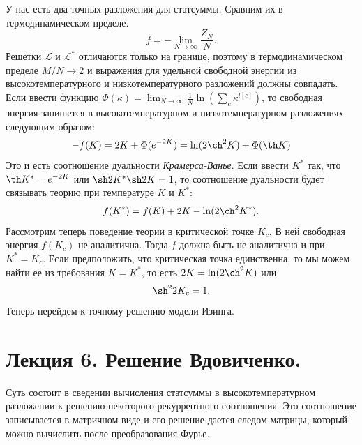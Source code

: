 \documentclass[a4paper,12pt]{article}
\theoremstyle{definition}
\theoremstyle{definition}
\theoremstyle{definition}
\begin{document}
У нас есть два точных разложения для статсуммы. Сравним их в термодинамическом пределе.
\begin{equation}
  \label{eq:109}
  f=-\lim_{N\to \infty}\frac{Z_N}{N}.
\end{equation}
Решетки $\mathcal{L}$ и $\mathcal{L}^*$ отличаются только на границе, поэтому в термодинамическом пределе $M/N\to 2$ и выражения для удельной свободной энергии из высокотемпературного и низкотемпературного разложений должны совпадать. Если ввести функцию $\Phi(\kappa)=\lim_{N\to \infty}\frac{1}{N} \ln \left(\sum_c \kappa^{l[c]}\right)$, то свободная энергия запишется в высокотемпературном и низкотемпературном разложениях следующим образом:
\begin{equation}
  \label{eq:110}
  -f(K)=2K+\Phi(e^{-2K})=\ln(2\ch^2 K)+\Phi(\th K)
\end{equation}
Это и есть соотношение дуальности {\it Крамерса-Ванье}. Если ввести $K^*$ так, что $\th K^*=e^{-2K}$ или $\sh 2K^* \sh 2K=1$, то соотношение дуальности будет связывать теорию при температуре $K$ и $K^*$:
\begin{equation}
  \label{eq:111}
  f(K^*)=f(K)+2K-\ln(2\ch^2 K^*).
\end{equation}
Рассмотрим теперь поведение теории в критической точке $K_c$. В ней свободная энергия $f(K_c)$ не аналитична. Тогда $f$ должна быть не аналитична и при $K^*=K_c$. Если предположить, что критическая точка единственна, то мы можем найти ее из требования $K=K^*$, то есть $2K=\ln(2\ch^2 K)$ или
\begin{equation}
  \label{eq:112}
  \sh^2 2K_c=1.
\end{equation}
Теперь перейдем к точному решению модели Изинга.
\section{Лекция 6. Решение Вдовиченко.}
\label{sec:lecture-6}
Суть состоит в сведении вычисления статсуммы в высокотемпературном разложении к решению некоторого рекуррентного соотношения. Это соотношение записывается в матричном виде и его решение дается следом матрицы, который можно вычислить после преобразования Фурье.
\end{document}
